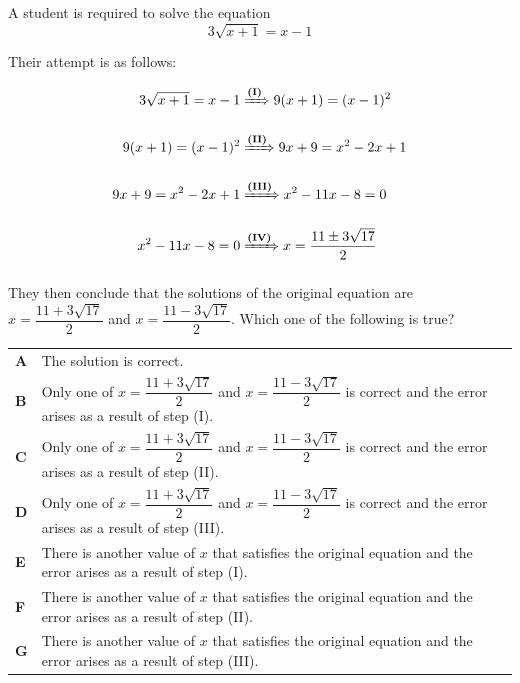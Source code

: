 \documentclass[11pt,a4paper]{article}
\begin{document}
\begin{enumerate}[label=\textbf{\arabic*.},leftmargin=*,itemsep=0pt,start=4]
\questionitem[Algebra]
A student is required to solve the equation \[ 3\sqrt{x+1}=x-1 \]

Their attempt is as follows:

\[ \begin{aligned} 3\sqrt{x+1}=x-1 &\xRightarrow{\textbf{(I)}} 9(x+1)=(x-1)^2\\[10pt] 9(x+1)=(x-1)^2 &\xRightarrow{\textbf{(II)}} 9x+9=x^2-2x+1\\[10pt] 9x+9=x^2-2x+1 &\xRightarrow{\textbf{(III)}} x^2-11x-8=0\\[10pt] x^2-11x-8=0 &\xRightarrow{\textbf{(IV)}} x=\dfrac{11\pm 3\sqrt{17}}{2} \\[10pt] \end{aligned} \] They then conclude that the solutions of the original equation are $x=\dfrac{11+3\sqrt{17}}{2}$ and $x=\dfrac{11-3\sqrt{17}}{2}$. Which one of the following is true?

\par\vspace*{12pt}
\begin{tabularx}{\linewidth}{@{}>{\bfseries}l Y@{}}
A &
The solution is correct.
\\[0.8em]
B &
Only one of $x=\dfrac{11+3\sqrt{17}}{2}$ and $x=\dfrac{11-3\sqrt{17}}{2}$ is correct and the error arises as a result of step (I).
\\[0.8em]
C &
Only one of $x=\dfrac{11+3\sqrt{17}}{2}$ and $x=\dfrac{11-3\sqrt{17}}{2}$ is correct and the error arises as a result of step (II).
\\[0.8em]
D &
Only one of $x=\dfrac{11+3\sqrt{17}}{2}$ and $x=\dfrac{11-3\sqrt{17}}{2}$ is correct and the error arises as a result of step (III).
\\[0.8em]
E &
There is another value of $x$ that satisfies the original equation and the error arises as a result of step (I).
\\[0.8em]
F &
There is another value of $x$ that satisfies the original equation and the error arises as a result of step (II).
\\[0.8em]
G &
There is another value of $x$ that satisfies the original equation and the error arises as a result of step (III).
\\
\end{tabularx}
\end{enumerate}
\end{document}
